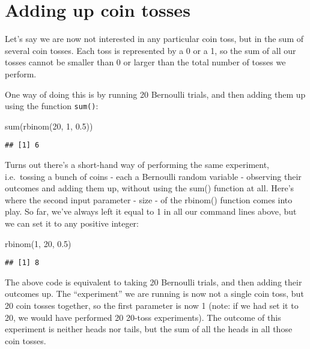 \documentclass[
]{book}
\newenvironment{Shaded}{\begin{snugshade}}{\end{snugshade}}
\newcommand{\DecValTok}[1]{\textcolor[rgb]{0.00,0.00,0.81}{#1}}
\newcommand{\FloatTok}[1]{\textcolor[rgb]{0.00,0.00,0.81}{#1}}
\newcommand{\FunctionTok}[1]{\textcolor[rgb]{0.00,0.00,0.00}{#1}}
\newcommand{\NormalTok}[1]{#1}
\begin{document}
\hypertarget{adding-up-coin-tosses}{%
\section{Adding up coin tosses}\label{adding-up-coin-tosses}}

Let's say we are now not interested in any particular coin toss, but in the sum of several coin tosses. Each toss is represented by a 0 or a 1, so the sum of all our tosses cannot be smaller than 0 or larger than the total number of tosses we perform.

One way of doing this is by running 20 Bernoulli trials, and then adding them up using the function \texttt{sum()}:

\begin{Shaded}
\begin{Highlighting}[]
\FunctionTok{sum}\NormalTok{(}\FunctionTok{rbinom}\NormalTok{(}\DecValTok{20}\NormalTok{, }\DecValTok{1}\NormalTok{, }\FloatTok{0.5}\NormalTok{))}
\end{Highlighting}
\end{Shaded}

\begin{verbatim}
## [1] 6
\end{verbatim}

Turns out there's a short-hand way of performing the same experiment, i.e.~tossing a bunch of coins - each a Bernoulli random variable - observing their outcomes and adding them up, without using the sum() function at all. Here's where the second input parameter - size - of the rbinom() function comes into play. So far, we've always left it equal to 1 in all our command lines above, but we can set it to any positive integer:

\begin{Shaded}
\begin{Highlighting}[]
\FunctionTok{rbinom}\NormalTok{(}\DecValTok{1}\NormalTok{, }\DecValTok{20}\NormalTok{, }\FloatTok{0.5}\NormalTok{)}
\end{Highlighting}
\end{Shaded}

\begin{verbatim}
## [1] 8
\end{verbatim}

The above code is equivalent to taking 20 Bernoulli trials, and then adding their outcomes up. The ``experiment'' we are running is now not a single coin toss, but 20 coin tosses together, so the first parameter is now 1 (note: if we had set it to 20, we would have performed 20 20-toss experiments). The outcome of this experiment is neither heads nor tails, but the sum of all the heads in all those coin tosses.
\end{document}
